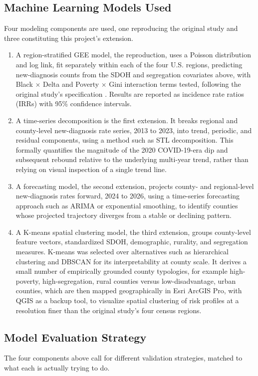 \documentclass[11pt,letterpaper]{article}
\begin{document}
\subsection{Machine Learning Models Used}
Four modeling components are used, one reproducing the original study and three constituting this project's extension.

\begin{enumerate}[leftmargin=1.4em]
\item A region-stratified GEE model, the reproduction, uses a Poisson distribution and log link, fit separately within each of the four U.S. regions, predicting new-diagnosis counts from the SDOH and segregation covariates above, with Black $\times$ Delta and Poverty $\times$ Gini interaction terms tested, following the original study's specification \cite{garrett2026}. Results are reported as incidence rate ratios (IRRs) with 95\% confidence intervals.
\item A time-series decomposition is the first extension. It breaks regional and county-level new-diagnosis rate series, 2013 to 2023, into trend, periodic, and residual components, using a method such as STL decomposition. This formally quantifies the magnitude of the 2020 COVID-19-era dip and subsequent rebound relative to the underlying multi-year trend, rather than relying on visual inspection of a single trend line.
\item A forecasting model, the second extension, projects county- and regional-level new-diagnosis rates forward, 2024 to 2026, using a time-series forecasting approach such as ARIMA or exponential smoothing, to identify counties whose projected trajectory diverges from a stable or declining pattern.
\item A K-means spatial clustering model, the third extension, groups county-level feature vectors, standardized SDOH, demographic, rurality, and segregation measures. K-means was selected over alternatives such as hierarchical clustering and DBSCAN for its interpretability at county scale. It derives a small number of empirically grounded county typologies, for example high-poverty, high-segregation, rural counties versus low-disadvantage, urban counties, which are then mapped geographically in Esri ArcGIS Pro, with QGIS as a backup tool, to visualize spatial clustering of risk profiles at a resolution finer than the original study's four census regions.
\end{enumerate}

\subsection{Model Evaluation Strategy}
The four components above call for different validation strategies, matched to what each is actually trying to do.
\end{document}
